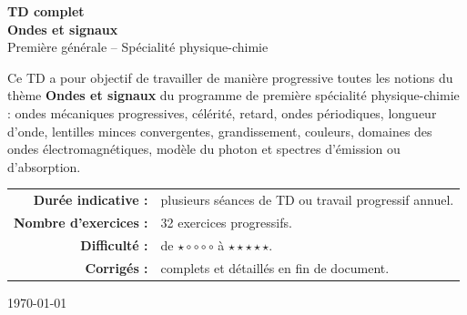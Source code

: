 \documentclass[11pt,a4paper]{article}
\newcounter{exercice}
\begin{document}
\begin{titlepage}
\begin{center}
\vspace*{1cm}

{\Huge\bfseries TD complet}\\[0.3cm]
{\Huge\bfseries Ondes et signaux}\\[0.5cm]

{\Large Première générale -- Spécialité physique-chimie}\\[1cm]


\vfill

\begin{tcolorbox}[colback=bleuclair,colframe=bleu,width=0.9\textwidth,title=\textbf{Objectif du TD}]
Ce TD a pour objectif de travailler de manière progressive toutes les notions du thème
\textbf{Ondes et signaux} du programme de première spécialité physique-chimie :
ondes mécaniques progressives, célérité, retard, ondes périodiques, longueur d'onde,
lentilles minces convergentes, grandissement, couleurs, domaines des ondes électromagnétiques,
modèle du photon et spectres d'émission ou d'absorption.
\end{tcolorbox}

\vfill

\begin{tabular}{rl}
\textbf{Durée indicative :} & plusieurs séances de TD ou travail progressif annuel.\\
\textbf{Nombre d'exercices :} & 32 exercices progressifs.\\
\textbf{Difficulté :} & de $\star\circ\circ\circ\circ$ à $\star\star\star\star\star$.\\
\textbf{Corrigés :} & complets et détaillés en fin de document.\\
\end{tabular}

\vfill

{\large \today}

\end{center}
\end{titlepage}
\end{document}

